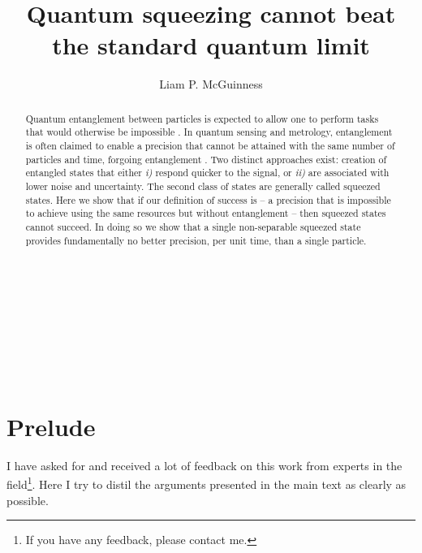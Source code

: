 \documentclass[reqno]{amsart}
\begin{document}
\title{Quantum squeezing cannot beat the standard quantum limit}

\maketitle

\begin{centering}
\author{Liam P. McGuinness}\\
\address{Laser Physics Centre, Research School of Physics, Australian National University, Acton,}\\
\address{Australian Capital Territory 2601, Australia}\\
\\
\end{centering}



\begin{abstract}
Quantum entanglement between particles is expected to allow one to perform tasks that would otherwise be impossible \cite{Bell1964,Feynman1982,Deutsch1985, Shor1994, Giovannetti2001}. In quantum sensing and metrology, entanglement is often claimed to enable a precision that cannot be attained with the same number of particles and time, forgoing entanglement \cite{Helstrom1969, Holevo1973a, Giovannetti2004, Giovannetti2006, DemkowiczDobrzanski2012, Zwierz2012, Pezze2018}. Two distinct approaches exist: creation of entangled states that either \emph{i)} respond quicker to the signal, or \emph{ii)} are associated with lower noise and uncertainty. The second class of states are generally called squeezed states. Here we show that if our definition of success is -- a precision that is impossible to achieve using the same resources but without entanglement -- then squeezed states cannot succeed. In doing so we show that a single non-separable squeezed state provides fundamentally no better precision, per unit time, than a single particle.\\
\end{abstract}

\section*{Prelude}
I have asked for and received a lot of feedback on this work from experts in the field\footnote{If you have any feedback, please contact me.}. Here I try to distil the arguments presented in the main text as clearly as possible.\\
\end{document}
